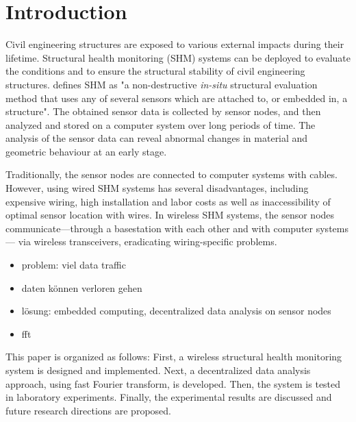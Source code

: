 \documentclass[12pt,a4paper]{scrartcl}
\begin{document}

\section*{Introduction}

Civil engineering structures are exposed to various external impacts during their lifetime. 
Structural health monitoring (SHM) systems can be deployed to evaluate the conditions and to ensure the structural stability of civil engineering structures.
\citet{BisbySHM} defines SHM as "a non-destructive \textit{in-situ} structural evaluation method that uses any of several sensors which are attached to, or embedded in, a structure".
The obtained sensor data is collected by sensor nodes, and then analyzed and stored on a computer system over long periods of time. 
The analysis of the sensor data can reveal abnormal changes in material and geometric behaviour at an early stage.

Traditionally, the sensor nodes are connected to computer systems with cables.
However, using wired SHM systems has several disadvantages, including expensive wiring, high installation and labor costs as well as inaccessibility of optimal sensor location with wires.
In wireless SHM systems, the sensor nodes communicate---through a basestation with each other and with computer systems--- via wireless transceivers, eradicating wiring-specific problems.

\begin{itemize}
	\item problem: viel data traffic
	\item daten können verloren gehen
	\item lösung: embedded computing, decentralized data analysis on sensor nodes 
	\item fft
\end{itemize}

This paper is organized as follows:
First, a wireless structural health monitoring system is designed and implemented. 
Next, a decentralized data analysis approach, using fast Fourier transform, is developed.
Then, the system is tested in laboratory experiments.
Finally, the experimental results are discussed and future research directions are proposed.


\newpage
\end{document}
